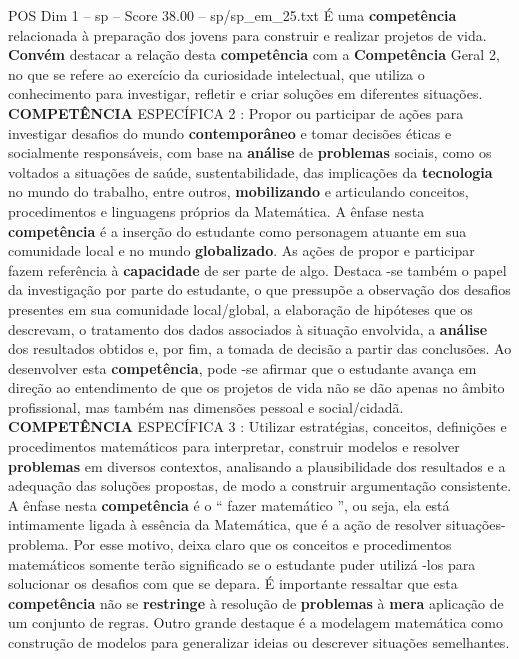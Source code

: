 \begin{textsample}{POS Dim 1 – sp – Score 38.00 – sp/sp\_em\_25.txt}
É uma \textbf{competência} relacionada à preparação dos jovens para construir e realizar projetos de vida. \textbf{Convém} destacar a relação desta \textbf{competência} com a \textbf{Competência} Geral 2, no que se refere ao exercício da curiosidade intelectual, que utiliza o conhecimento para investigar, refletir e criar soluções em diferentes situações. \textbf{COMPETÊNCIA} ESPECÍFICA 2 : Propor ou participar de ações para investigar desafios do mundo \textbf{contemporâneo} e tomar decisões éticas e socialmente responsáveis, com base na \textbf{análise} de \textbf{problemas} sociais, como os voltados a situações de saúde, sustentabilidade, das implicações da \textbf{tecnologia} no mundo do trabalho, entre outros, \textbf{mobilizando} e articulando conceitos, procedimentos e linguagens próprios da Matemática.
A ênfase nesta \textbf{competência} é a inserção do estudante como personagem atuante em sua comunidade local e no mundo \textbf{globalizado}.
As ações de propor e participar fazem referência à \textbf{capacidade} de ser parte de algo.
Destaca -se também o papel da investigação por parte do estudante, o que pressupõe a observação dos desafios presentes em sua comunidade local/global, a elaboração de hipóteses que os descrevam, o tratamento dos dados associados à situação envolvida, a \textbf{análise} dos resultados obtidos e, por fim, a tomada de decisão a partir das conclusões.
Ao desenvolver esta \textbf{competência}, pode -se afirmar que o estudante avança em direção ao entendimento de que os projetos de vida não se dão apenas no âmbito profissional, mas também nas dimensões pessoal e social/cidadã. \textbf{COMPETÊNCIA} ESPECÍFICA 3 : Utilizar estratégias, conceitos, definições e procedimentos matemáticos para interpretar, construir modelos e resolver \textbf{problemas} em diversos contextos, analisando a plausibilidade dos resultados e a adequação das soluções propostas, de modo a construir argumentação consistente.
A ênfase nesta \textbf{competência} é o “ fazer matemático ”, ou seja, ela está intimamente ligada à essência da Matemática, que é a ação de resolver situações-problema.
Por esse motivo, deixa claro que os conceitos e procedimentos matemáticos somente terão significado se o estudante puder utilizá -los para solucionar os desafios com que se depara.
É importante ressaltar que esta \textbf{competência} não se \textbf{restringe} à resolução de \textbf{problemas} à \textbf{mera} aplicação de um conjunto de regras.
Outro grande destaque é a modelagem matemática como construção de modelos para generalizar ideias ou descrever situações semelhantes.

\end{textsample}
